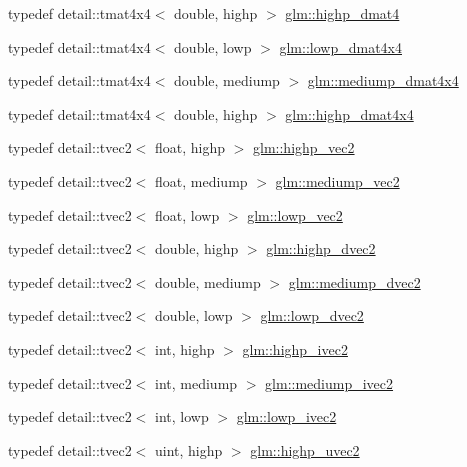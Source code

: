\begin{DoxyCompactItemize}
\item 
typedef detail\+::tmat4x4$<$ double, highp $>$ \hyperlink{group__core__precision_ga9a5d95e476d451d28d3939ac7f124baf}{glm\+::highp\+\_\+dmat4}
\item 
typedef detail\+::tmat4x4$<$ double, lowp $>$ \hyperlink{group__core__precision_gac762dec40f53114dfe6894499a2c9a79}{glm\+::lowp\+\_\+dmat4x4}
\item 
typedef detail\+::tmat4x4$<$ double, mediump $>$ \hyperlink{group__core__precision_gad64329d45b05417ccf0cc3c23f584d26}{glm\+::mediump\+\_\+dmat4x4}
\item 
typedef detail\+::tmat4x4$<$ double, highp $>$ \hyperlink{group__core__precision_ga1c0a2edbde597b59e9005691a224b208}{glm\+::highp\+\_\+dmat4x4}
\item 
typedef detail\+::tvec2$<$ float, highp $>$ \hyperlink{group__core__precision_ga37645abcfcc1278567e99f1ca492bfbb}{glm\+::highp\+\_\+vec2}
\item 
typedef detail\+::tvec2$<$ float, mediump $>$ \hyperlink{group__core__precision_ga1365858c541931eb8a7473fa85a1d1cf}{glm\+::mediump\+\_\+vec2}
\item 
typedef detail\+::tvec2$<$ float, lowp $>$ \hyperlink{group__core__precision_gac63d79532b7e8d18f579ebe63e4fde49}{glm\+::lowp\+\_\+vec2}
\item 
typedef detail\+::tvec2$<$ double, highp $>$ \hyperlink{group__core__precision_gacfbe8512142fff27f0bfb44958c1752f}{glm\+::highp\+\_\+dvec2}
\item 
typedef detail\+::tvec2$<$ double, mediump $>$ \hyperlink{group__core__precision_gace1f1cc2eb8e978dcb60e682af87b541}{glm\+::mediump\+\_\+dvec2}
\item 
typedef detail\+::tvec2$<$ double, lowp $>$ \hyperlink{group__core__precision_ga27a115a27d5f065e8c043f57191d583b}{glm\+::lowp\+\_\+dvec2}
\item 
typedef detail\+::tvec2$<$ int, highp $>$ \hyperlink{group__core__precision_gab2bac6095f51f7d7f74747afc2f6747a}{glm\+::highp\+\_\+ivec2}
\item 
typedef detail\+::tvec2$<$ int, mediump $>$ \hyperlink{group__core__precision_ga4f1bf9844e667805235823afe809aa73}{glm\+::mediump\+\_\+ivec2}
\item 
typedef detail\+::tvec2$<$ int, lowp $>$ \hyperlink{group__core__precision_ga562c5c67d6431ab88fc4a032239e2137}{glm\+::lowp\+\_\+ivec2}
\item 
typedef detail\+::tvec2$<$ uint, highp $>$ \hyperlink{group__core__precision_gaaf92be4c1fca33cff90c1ed15b521c79}{glm\+::highp\+\_\+uvec2}

\end{DoxyCompactItemize}
